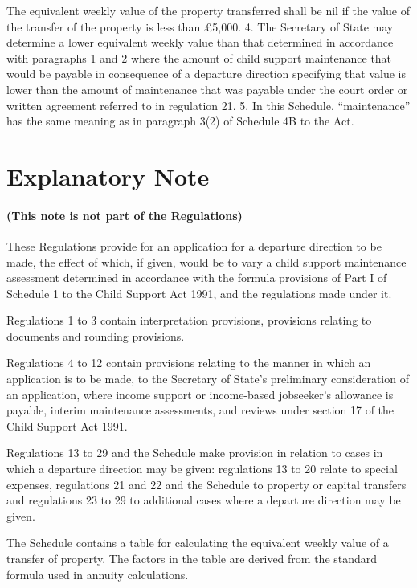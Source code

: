 \documentclass[a4paper]{article}
\newcommand{\parthead}{}
\begin{document}
The equivalent weekly value of the property transferred shall be nil if the
value of the transfer of the property is less than £5,000.
4. The Secretary of State may determine a lower equivalent weekly value than
that determined in accordance with paragraphs 1 and 2 where the amount of child
support maintenance that would be payable in consequence of a departure
direction specifying that value is lower than the amount of maintenance that was
payable under the court order or written agreement referred to in regulation 21.
5. In this Schedule, “maintenance” has the same meaning as in paragraph 3(2) of
Schedule 4B to the Act.


\part{Explanatory Note}

\renewcommand\parthead{--- Explanatory Note}

\subsection*{(This note is not part of the Regulations)}

These Regulations provide for an application for a departure direction to be
made, the effect of which, if given, would be to vary a child support
maintenance assessment determined in accordance with the formula provisions of
Part I of Schedule 1 to the Child Support Act 1991, and the regulations made
under it.

Regulations 1 to 3 contain interpretation provisions, provisions relating to
documents and rounding provisions.

Regulations 4 to 12 contain provisions relating to the manner in which an
application is to be made, to the Secretary of State’s preliminary consideration
of an application, where income support or income-based jobseeker’s allowance is
payable, interim maintenance assessments, and reviews under section 17 of the
Child Support Act 1991.

Regulations 13 to 29 and the Schedule make provision in relation to cases in
which a departure direction may be given: regulations 13 to 20 relate to special
expenses, regulations 21 and 22 and the Schedule to property or capital
transfers and regulations 23 to 29 to additional cases where a departure
direction may be given.

The Schedule contains a table for calculating the equivalent weekly value of a
transfer of property. The factors in the table are derived from the standard
formula used in annuity calculations.
\end{document}
